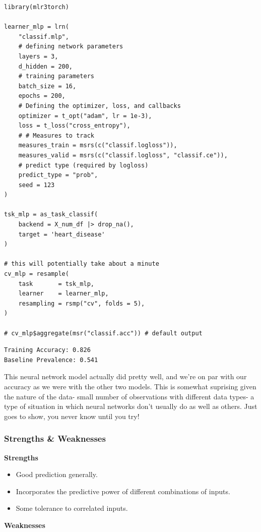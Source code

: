 \documentclass[
  letterpaper,
]{krantz}
\providecommand{\tightlist}{%
  \setlength{\itemsep}{0pt}\setlength{\parskip}{0pt}}\usepackage{longtable,booktabs,array}
\begin{document}
\begin{verbatim}
library(mlr3torch)

learner_mlp = lrn(
    "classif.mlp",
    # defining network parameters
    layers = 3,
    d_hidden = 200,
    # training parameters
    batch_size = 16,
    epochs = 200,
    # Defining the optimizer, loss, and callbacks
    optimizer = t_opt("adam", lr = 1e-3),
    loss = t_loss("cross_entropy"),
    # # Measures to track
    measures_train = msrs(c("classif.logloss")),
    measures_valid = msrs(c("classif.logloss", "classif.ce")),
    # predict type (required by logloss)
    predict_type = "prob",
    seed = 123
)

tsk_mlp = as_task_classif(
    backend = X_num_df |> drop_na(),
    target = 'heart_disease'
)

# this will potentially take about a minute
cv_mlp = resample(
    task       = tsk_mlp,
    learner    = learner_mlp,
    resampling = rsmp("cv", folds = 5),
)

# cv_mlp$aggregate(msr("classif.acc")) # default output
\end{verbatim}

\begin{verbatim}
Training Accuracy: 0.826
Baseline Prevalence: 0.541
\end{verbatim}

This neural network model actually did pretty well, and we're on par
with our accuracy as we were with the other two models. This is somewhat
suprising given the nature of the data- small number of observations
with different data types- a type of situation in which neural networks
don't usually do as well as others. Just goes to show, you never know
until you try!

\subsubsection{Strengths \& Weaknesses}\label{strengths-weaknesses-2}

\textbf{Strengths}

\begin{itemize}
\tightlist
\item
  Good prediction generally.
\item
  Incorporates the predictive power of different combinations of inputs.
\item
  Some tolerance to correlated inputs.
\end{itemize}

\textbf{Weaknesses}
\end{document}
